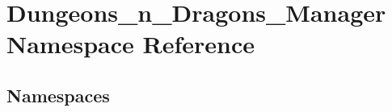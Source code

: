 \hypertarget{namespace_dungeons__n___dragons___manager}{}\section{Dungeons\+\_\+n\+\_\+\+Dragons\+\_\+\+Manager Namespace Reference}
\label{namespace_dungeons__n___dragons___manager}
\subsection*{Namespaces}
\begin{DoxyCompactItemize}
\end{DoxyCompactItemize}
